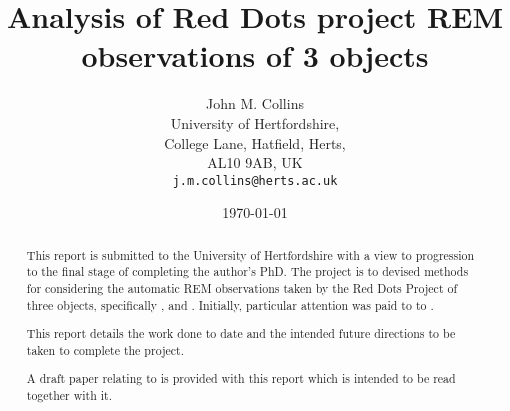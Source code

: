 \title{Analysis of Red Dots project REM observations of 3 {\rdwarf} objects}

\author{John M. Collins\\
  University of Hertfordshire,\\
  College Lane, Hatfield, Herts, \\
  AL10 9AB, UK\\
  \texttt{j.m.collins@herts.ac.uk}\\
  }
\engwithth
\date{\today}
\maketitle

\protect\label{firstpage}

\begin{abstract}

  This report is submitted to the University of Hertfordshire with a
  view to progression to the final stage of completing the author's
  PhD. The project is to devised methods for considering the automatic REM
  observations taken by the Red Dots Project of three {\rdwarf} objects,
  specifically \prox, {\bstar} and \ross. Initially, particular attention was
  paid to to \ross.
  
  This report details the work done to date and the intended future directions
  to be taken to complete the project.
  
  A draft paper relating to {\ross} is provided with this report which is
  intended to be read together with it.
  
  
\end{abstract}


